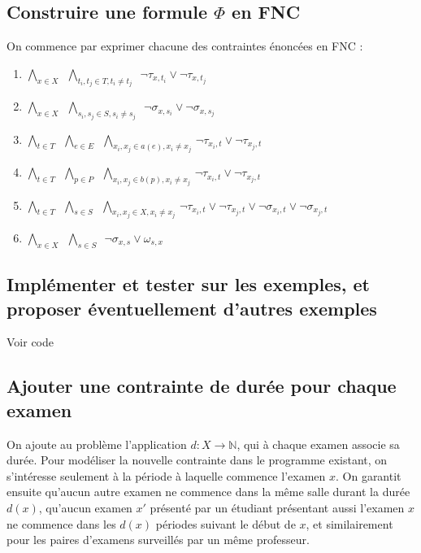 \documentclass[a4paper]{article}
\begin{document}
\subsection{Construire une formule $\Phi$ en FNC}
On commence par exprimer chacune des contraintes énoncées en FNC :

\begin{enumerate}
  \item $ \bigwedge\limits_{x \in X} \,\,\,
          \bigwedge\limits_{t_i, t_j \in T, t_i \neq t_j} \,\,\,
          \lnot \tau_{x,t_i} \lor \lnot \tau_{x,t_j}$
  \item $ \bigwedge\limits_{x \in X} \,\,\,
          \bigwedge\limits_{s_i, s_j \in S, s_i \neq s_j} \,\,\,
          \lnot \sigma_{x,s_i} \lor \lnot \sigma_{x,s_j}$
  \item $ \bigwedge\limits_{t \in T} \,\,\,
          \bigwedge\limits_{e \in E} \,\,\,
          \bigwedge\limits_{x_i, x_j \in a(e), x_i \neq x_j} \,
          \lnot \tau_{x_i,t} \lor \lnot \tau_{x_j,t}$
  \item $ \bigwedge\limits_{t \in T} \,\,\,
          \bigwedge\limits_{p \in P} \,\,\,
          \bigwedge\limits_{x_i, x_j \in b(p), x_i \neq x_j} \,
          \lnot \tau_{x_i,t} \lor \lnot \tau_{x_j,t}$
  \item $ \bigwedge\limits_{t \in T} \,\,\,
          \bigwedge\limits_{s \in S} \,\,\,
          \bigwedge\limits_{x_i, x_j \in X, x_i \neq x_j} \,
          \lnot \tau_{x_i,t} \lor \lnot \tau_{x_j,t} \lor \lnot \sigma_{x_i,t} \lor \lnot \sigma_{x_j,t}$
  \item $ \bigwedge\limits_{x \in X} \,\,\,
          \bigwedge\limits_{s \in S} \,\,\,
          \lnot \sigma_{x,s} \lor \omega_{s,x}$
\end{enumerate}

\subsection{Implémenter et tester sur les exemples, et proposer éventuellement d’autres exemples}
Voir code

\subsection{Ajouter une contrainte de durée pour chaque examen}
On ajoute au problème l'application $ d : X \rightarrow \mathbb{N} $, qui à chaque examen associe
sa durée. Pour modéliser la nouvelle contrainte dans le programme existant, on s'intéresse seulement à la période
à laquelle commence l'examen $x$. On garantit ensuite qu'aucun autre examen ne commence dans la même salle durant
la durée $d(x)$, qu'aucun examen $x'$ présenté par un étudiant présentant aussi l'examen $x$ ne commence dans les
$d(x)$ périodes suivant le début de $x$, et similairement pour les paires d'examens surveillés par un même professeur.
\end{document}
